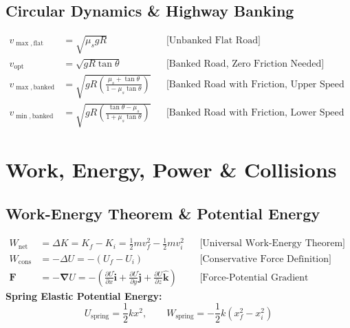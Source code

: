 \documentclass[11pt,a4paper]{article}
\begin{document}
\subsection{Circular Dynamics \& Highway Banking}

\begin{formulabox}
\begin{align}
  v_{\max,\text{flat}} &= \sqrt{\mu_s g R} && \text{[Unbanked Flat Road]} \\
  v_{\text{opt}} &= \sqrt{g R \tan\theta} && \text{[Banked Road, Zero Friction Needed]} \\
  v_{\max,\text{banked}} &= \sqrt{g R \left(\frac{\mu_s + \tan\theta}{1 - \mu_s\tan\theta}\right)} && \text{[Banked Road with Friction, Upper Speed Limit]} \\
  v_{\min,\text{banked}} &= \sqrt{g R \left(\frac{\tan\theta - \mu_s}{1 + \mu_s\tan\theta}\right)} && \text{[Banked Road with Friction, Lower Speed Limit]}
\end{align}
\end{formulabox}

\newpage

\section{Work, Energy, Power \& Collisions}

\subsection{Work-Energy Theorem \& Potential Energy}

\begin{formulabox}
\begin{align}
  W_{\text{net}} &= \Delta K = K_f - K_i = \frac{1}{2}m v_f^2 - \frac{1}{2}m v_i^2 && \text{[Universal Work-Energy Theorem]} \\
  W_{\text{cons}} &= -\Delta U = -(U_f - U_i) && \text{[Conservative Force Definition]} \\
  \mathbf{F} &= -\boldsymbol{\nabla} U = -\left(\frac{\partial U}{\partial x}\hat{\mathbf{i}} + \frac{\partial U}{\partial y}\hat{\mathbf{j}} + \frac{\partial U}{\partial z}\hat{\mathbf{k}}\right) && \text{[Force-Potential Gradient Relation]}
\end{align}
\textbf{Spring Elastic Potential Energy:}
\begin{equation}
  U_{\text{spring}} = \frac{1}{2}k x^2, \qquad W_{\text{spring}} = -\frac{1}{2}k(x_f^2 - x_i^2)
\end{equation}
\end{formulabox}
\end{document}
